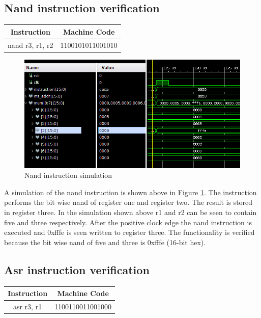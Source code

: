 \documentclass{article}
\begin{document}
	\subsection{Nand instruction verification}
		\vspace{.5cm}
		\begin{center}
			\begin{tabular}{|c|c|}
				\hline 
				\textbf{Instruction} & \textbf{Machine Code} \\ 
				\hline 
				nand r3, r1, r2 & 1100101011001010 \\ 
				\hline 
			\end{tabular} 
		\end{center}
		
		\begin{figure}[H]
			\centering
			\includegraphics[width=5in]{img/nandinstb.png}
			\caption{Nand instruction simulation}
			\label{fig:nandinstb}
		\end{figure}
		
		\begin{par}
			A simulation of the nand instruction is shown above in Figure \ref{fig:nandinstb}. The instruction performs the bit wise nand of register one and register two. The result is stored in register three. In the simulation shown above r1 and r2 can be seen to contain five and three respectively. After the positive clock edge the nand instruction is executed and 0xfffe is seen written to register three. The functionality is verified because the bit wise nand of five and three is 0xfffe (16-bit hex). 
		\end{par}
		\newpage
		
	\subsection{Asr instruction verification}
		\vspace{.5cm}
		\begin{center}
			\begin{tabular}{|c|c|}
				\hline 
				\textbf{Instruction} & \textbf{Machine Code} \\ 
				\hline 
				asr r3, r1 & 1100110011001000 \\ 
				\hline 
			\end{tabular} 
		\end{center}
		
\end{document}
